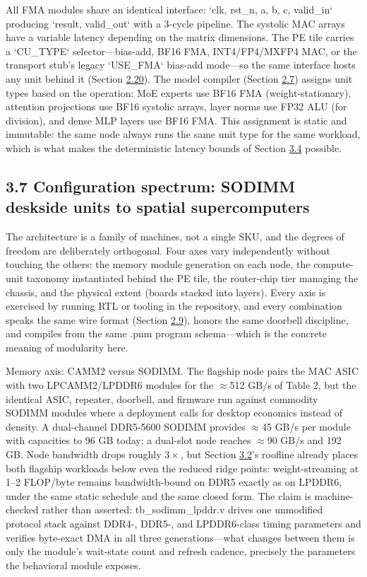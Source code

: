 \documentclass[10pt,twocolumn]{article}
\begin{document}
All FMA modules share an identical interface: `clk, rst\_n, a, b, c, valid\_in` producing `result, valid\_out` with a 3-cycle pipeline. The systolic MAC arrays have a variable latency depending on the matrix dimensions. The PE tile carries a `CU\_TYPE` selector---bias-add, BF16 FMA, INT4/FP4/MXFP4 MAC, or the transport stub's legacy `USE\_FMA` bias-add mode---so the same interface hosts any unit behind it (Section \hyperref[sec:2.20]{2.20}). The model compiler (Section \hyperref[sec:2.7]{2.7}) assigns unit types based on the operation: MoE experts use BF16 FMA (weight-stationary), attention projections use BF16 systolic arrays, layer norms use FP32 ALU (for division), and dense MLP layers use BF16 FMA. This assignment is static and immutable: the same node always runs the same unit type for the same workload, which is what makes the deterministic latency bounds of Section \hyperref[sec:3.4]{3.4} possible.

\subsection*{3.7 Configuration spectrum: SODIMM deskside units to spatial supercomputers}\label{sec:3.7}

The architecture is a family of machines, not a single SKU, and the degrees of freedom are deliberately orthogonal. Four axes vary independently without touching the others: the memory module generation on each node, the compute-unit taxonomy instantiated behind the PE tile, the router-chip tier managing the chassis, and the physical extent (boards stacked into layers). Every axis is exercised by running RTL or tooling in the repository, and every combination speaks the same wire format (Section \hyperref[sec:2.9]{2.9}), honors the same doorbell discipline, and compiles from the same .pnm program schema---which is the concrete meaning of modularity here.

Memory axis: CAMM2 versus SODIMM. The flagship node pairs the MAC ASIC with two LPCAMM2/LPDDR6 modules\cite{16,17} for the $\approx$512 GB/s of Table 2, but the identical ASIC, repeater, doorbell, and firmware run against commodity SODIMM modules\cite{30} where a deployment calls for desktop economics instead of density. A dual-channel DDR5-5600 SODIMM provides $\approx$45 GB/s per module with capacities to 96 GB today; a dual-slot node reaches $\approx$90 GB/s and 192 GB. Node bandwidth drops roughly $3\times$, but Section \hyperref[sec:3.2]{3.2}'s roofline already places both flagship workloads below even the reduced ridge points: weight-streaming at 1--2 FLOP/byte remains bandwidth-bound on DDR5 exactly as on LPDDR6, under the same static schedule and the same closed form. The claim is machine-checked rather than asserted: tb\_sodimm\_lpddr.v drives one unmodified protocol stack against DDR4-, DDR5-, and LPDDR6-class timing parameters and verifies byte-exact DMA in all three generations---what changes between them is only the module's wait-state count and refresh cadence, precisely the parameters the behavioral module exposes.
\end{document}
